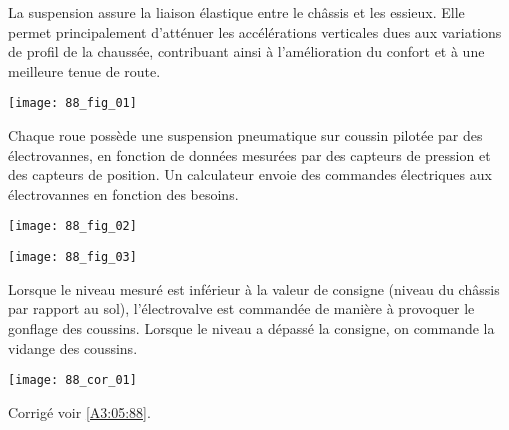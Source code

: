 \normaltrue \difficilefalse \tdifficilefalse
\correctionfalse

\setcounter{question}{0}
\ifcorrection
\else
{}
\fi



\ifprof
\else
La suspension assure la liaison élastique entre le châssis et les essieux. Elle permet principalement d’atténuer les accélérations verticales dues aux variations de profil de la chaussée, contribuant ainsi à l’amélioration du confort et à une meilleure tenue de route.

\begin{marginfigure}
\texttt{[image: 88\_fig\_01]}
\end{marginfigure}

Chaque roue possède une suspension pneumatique sur coussin pilotée par des électrovannes, en fonction de données mesurées par des capteurs de pression et des capteurs de position. Un calculateur envoie des commandes électriques aux électrovannes en fonction des besoins.

\begin{marginfigure}
\texttt{[image: 88\_fig\_02]}
\end{marginfigure}


\begin{marginfigure}
\texttt{[image: 88\_fig\_03]}
\end{marginfigure}

Lorsque le niveau mesuré est inférieur à la valeur de consigne (niveau du châssis par rapport au sol), l’électrovalve est commandée de manière à provoquer le gonflage des coussins.
Lorsque le niveau a dépassé la consigne, on commande la vidange des coussins.

\fi
{}
\ifprof
\begin{corrige}
\begin{marginfigure}
\texttt{[image: 88\_cor\_01]}
\end{marginfigure}
\end{corrige}
\else
\fi







\ifprof
\else
\begin{flushright}
\footnotesize{Corrigé  voir \ref{A3:05:88}.}
\end{flushright}%
\fi